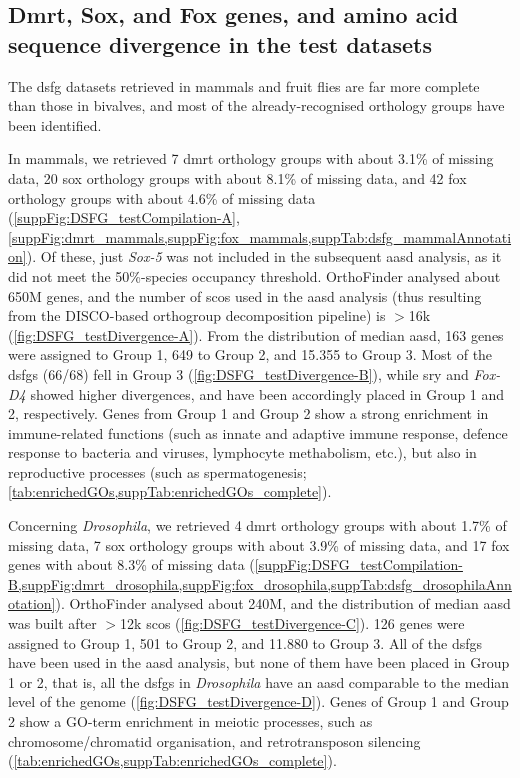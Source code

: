 \subsection{Dmrt, Sox, and Fox genes, and amino acid sequence divergence in the test datasets}
The \gls{dsfg} datasets retrieved in mammals and fruit flies are far more complete than those in bivalves, and most of the already-recognised orthology groups have been identified.

In mammals, we retrieved 7 \gls{dmrt} orthology groups with about 3.1\% of missing data, 20 \gls{sox} orthology groups with about 8.1\% of missing data, and 42 \gls{fox} orthology groups with about 4.6\% of missing data (\cref{suppFig:DSFG_testCompilation-A}, \cref{suppFig:dmrt_mammals,suppFig:fox_mammals,suppTab:dsfg_mammalAnnotation}). Of these, just \textit{Sox-5} was not included in the subsequent \gls{aasd} analysis, as it did not meet the 50\%-species occupancy threshold. OrthoFinder analysed about 650M genes, and the number of \glspl{sco} used in the \gls{aasd} analysis (thus resulting from the DISCO-based orthogroup decomposition pipeline) is $>$16k (\cref{fig:DSFG_testDivergence-A}). From the distribution of median \gls{aasd}, 163 genes were assigned to Group 1, 649 to Group 2, and 15.355 to Group 3. Most of the \glspl{dsfg} (66/68) fell in Group 3 (\cref{fig:DSFG_testDivergence-B}), while \gls{sry} and \textit{Fox-D4} showed higher divergences, and have been accordingly placed in Group 1 and 2, respectively. Genes from Group 1 and Group 2 show a strong enrichment in immune-related functions (such as innate and adaptive immune response, defence response to bacteria and viruses, lymphocyte methabolism, etc.), but also in reproductive processes (such as spermatogenesis; \cref{tab:enrichedGOs,suppTab:enrichedGOs_complete}).

Concerning \textit{Drosophila}, we retrieved 4 \gls{dmrt} orthology groups with about 1.7\% of missing data, 7 \gls{sox} orthology groups with about 3.9\% of missing data, and 17 \gls{fox} genes with about 8.3\% of missing data (\cref{suppFig:DSFG_testCompilation-B,suppFig:dmrt_drosophila,suppFig:fox_drosophila,suppTab:dsfg_drosophilaAnnotation}). OrthoFinder analysed about 240M, and the distribution of median \gls{aasd} was built after $>$12k \glspl{sco} (\cref{fig:DSFG_testDivergence-C}). 126 genes were assigned to Group 1, 501 to Group 2, and 11.880 to Group 3. All of the \glspl{dsfg} have been used in the \gls{aasd} analysis, but none of them have been placed in Group 1 or 2, that is, all the \glspl{dsfg} in \textit{Drosophila} have an \gls{aasd} comparable to the median level of the genome (\cref{fig:DSFG_testDivergence-D}). Genes of Group 1 and Group 2 show a GO-term enrichment in meiotic processes, such as chromosome/chromatid organisation, and retrotransposon silencing (\cref{tab:enrichedGOs,suppTab:enrichedGOs_complete}).

